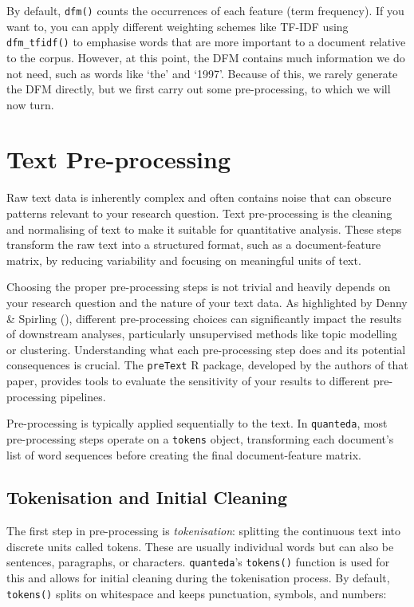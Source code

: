 \documentclass[
]{book}
\begin{document}
By default, \texttt{dfm()} counts the occurrences of each feature (term frequency). If you want to, you can apply different weighting schemes like TF-IDF using \texttt{dfm\_tfidf()} to emphasise words that are more important to a document relative to the corpus. However, at this point, the DFM contains much information we do not need, such as words like `the' and `1997'. Because of this, we rarely generate the DFM directly, but we first carry out some pre-processing, to which we will now turn.

\section{Text Pre-processing}\label{text-pre-processing}

Raw text data is inherently complex and often contains noise that can obscure patterns relevant to your research question. Text pre-processing is the cleaning and normalising of text to make it suitable for quantitative analysis. These steps transform the raw text into a structured format, such as a document-feature matrix, by reducing variability and focusing on meaningful units of text.

Choosing the proper pre-processing steps is not trivial and heavily depends on your research question and the nature of your text data. As highlighted by Denny \& Spirling (), different pre-processing choices can significantly impact the results of downstream analyses, particularly unsupervised methods like topic modelling or clustering. Understanding what each pre-processing step does and its potential consequences is crucial. The \texttt{preText} R package, developed by the authors of that paper, provides tools to evaluate the sensitivity of your results to different pre-processing pipelines.

Pre-processing is typically applied sequentially to the text. In \texttt{quanteda}, most pre-processing steps operate on a \texttt{tokens} object, transforming each document's list of word sequences before creating the final document-feature matrix.

\subsection{Tokenisation and Initial Cleaning}\label{tokenisation-and-initial-cleaning}

The first step in pre-processing is \emph{tokenisation}: splitting the continuous text into discrete units called tokens. These are usually individual words but can also be sentences, paragraphs, or characters. \texttt{quanteda}'s \texttt{tokens()} function is used for this and allows for initial cleaning during the tokenisation process. By default, \texttt{tokens()} splits on whitespace and keeps punctuation, symbols, and numbers:
\end{document}
